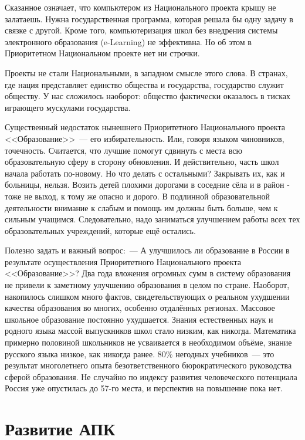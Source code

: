 \documentclass[article, 12pt, russian, oneside]{ncc}
\begin{document}
Сказанное означает, что компьютером из Национального проекта крышу не
залатаешь. Нужна государственная программа, которая решала бы одну
задачу в связке с другой. Кроме того, компьютеризация школ без
внедрения системы электронного образования (e-Learning) не
эффективна. Но об этом в Приоритетном Национальном проекте нет ни
строчки.

Проекты не стали Национальными, в западном смысле этого слова. В
странах, где нация представляет единство общества и государства,
государство служит обществу. У нас сложилось наоборот: общество
фактически оказалось в тисках играющего мускулами государства.

Существенный недостаток нынешнего Приоритетного Национального проекта
<<Образование>>~--- его избирательность. Или, говоря языком чиновников,
точечность. Считается, что лучшие помогут сдвинуть с места всю
образовательную сферу в сторону обновления. И действительно, часть
школ начала работать по-новому. Но что делать с остальными? Закрывать
их, как и больницы, нельзя. Возить детей плохими дорогами в соседние
сёла и в район - тоже не выход, к тому же опасно и дорого. В подлинной
образовательной деятельности внимание к слабым и помощь им должны быть
больше, чем к сильным учащимся. Следовательно, надо заниматься
улучшением работы всех тех образовательных учреждений, которые ещё
остались.

Полезно задать и важный вопрос:~--- А улучшилось ли образование в
России в результате осуществления Приоритетного Национального проекта
<<Образование>>? Два года вложения огромных сумм в систему образования
не привели к заметному улучшению образования в целом по
стране. Наоборот, накопилось слишком много фактов, свидетельствующих о
реальном ухудшении качества образования во многих, особенно отдалённых
регионах. Массовое школьное образование постоянно ухудшается. Знания
естественных наук и родного языка массой выпускников школ стало
низким, как никогда. Математика примерно половиной школьников не
усваивается в необходимом объёме, знание русского языка низкое, как
никогда ранее.  80\% негодных учебников~--- это результат многолетнего
опыта безответственного бюрократического руководства сферой
образования. Не случайно по индексу развития человеческого потенциала
Россия уже опустилась до 57-го места, и перспектив на повышение пока
нет.
\newpage

\section{Развитие АПК}
\end{document}

